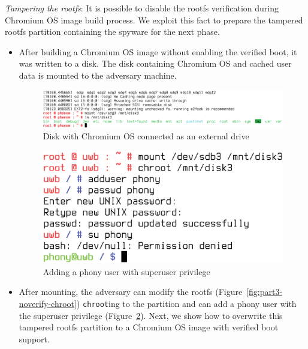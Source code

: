 \documentclass[11pt]{article}
\begin{document}
\begin{enumerate}
\emph{Tampering the rootfs}: It is possible to disable the rootfs verification during Chromium OS image build process. We exploit this fact to prepare the tampered rootfs partition containing the spyware for the next phase. 
\begin{itemize}
\item After building a Chromium OS image without enabling the verified boot, it was written to a disk. The disk containing Chromium OS and cached user data is mounted to the adversary machine. 
\begin{figure}[htbp]
  \centering
    \includegraphics[scale=0.2]{Figure/dmesg-mount-noverify.eps}
\caption{\small{Disk with Chromium OS connected as an external drive}}
\label{fig:dmesg-mount-noverify}
\end{figure}
\begin{figure}[htbp]
  \centering
    \includegraphics[scale=.25]{Figure/tampered-image-new-user.eps}
\caption{\small{Adding a phony user with superuser privilege}}
\label{fig:tampered-image-new-user}
\end{figure}
\item After mounting, the adversary can modify the rootfs (Figure~\ref{fig:part3-noverify-chroot}) \texttt{chroot}ing to the partition and can add a phony user with the superuser privilege (Figure~\ref{fig:tampered-image-new-user}). 
Next, we show how to overwrite this tampered rootfs partition to a Chromium OS image with verified boot support.

\end{itemize}
\end{enumerate}
\end{document}

